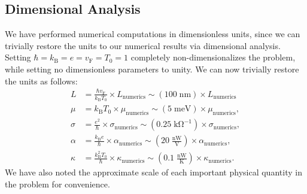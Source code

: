 \subsection{Dimensional Analysis}
We have performed numerical computations in dimensionless units,   since we can trivially restore the units to our numerical results via dimensional analysis.   Setting $\hbar=k_{\mathrm{B}}=e=v_{\mathrm{F}}=T_0=1$ completely non-dimensionalizes the problem, while setting no dimensionless parameters to unity.    We can now trivially restore the units as follows:  \begin{subequations}\begin{align}
L &= \frac{\hbar v_{\mathrm{F}}}{k_{\mathrm{B}}T_0} \times L_{\mathrm{numerics}} \sim (100 \; \mathrm{nm}) \times L_{\mathrm{numerics}} \\
\mu &= k_{\mathrm{B}}T_0  \times \mu_{\mathrm{numerics}} \sim (5\; \mathrm{meV}) \times \mu_{\mathrm{numerics}}, \\
\sigma &= \frac{e^2}{\hbar}  \times \sigma_{\mathrm{numerics}} \sim (0.25\; \mathrm{k\Omega}^{-1}) \times \sigma_{\mathrm{numerics}}, \\
\alpha &= \frac{k_{\mathrm{B}}e}{\hbar}  \times \alpha_{\mathrm{numerics}} \sim \left(20\; \frac{\mathrm{nW}}{\mathrm{V}}\right) \times \alpha_{\mathrm{numerics}}, \\
\kappa &= \frac{k_{\mathrm{B}}^2T_0}{\hbar}  \times \kappa_{\mathrm{numerics}} \sim \left(0.1\; \frac{\mathrm{nW}}{\mathrm{K}}\right)  \times \kappa_{\mathrm{numerics}}.
\end{align}\end{subequations}
We have also noted the approximate scale of each important physical quantity in the problem for convenience.
